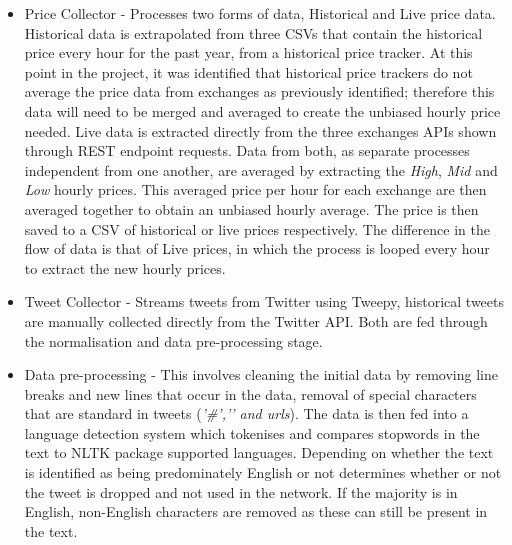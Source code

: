 \documentclass[oneside, 12pt]{article}
\begin{document}
		\begin{itemize}
			\item Price Collector - Processes two forms of data, Historical and Live price data. 
			\subitem Historical data is extrapolated from three CSVs that contain the historical price every hour for the past year, from a historical price tracker. At this point in the project, it was identified that historical price trackers do not average the price data from exchanges as previously identified; therefore this data will need to be merged and averaged to create the unbiased hourly price needed. 
			\subitem Live data is extracted directly from the three exchanges APIs shown through REST endpoint requests.
			\subitem Data from both, as separate processes independent from one another, are averaged by extracting the \textit{High}, \textit{Mid} and \textit{Low} hourly prices. This averaged price per hour for each exchange are then averaged together to obtain an unbiased hourly average. The price is then saved to a CSV of historical or live prices respectively. The difference in the flow of data is that of Live prices, in which the process is looped every hour to extract the new hourly prices. 
			\item Tweet Collector - Streams tweets from Twitter using Tweepy, historical tweets are manually collected directly from the Twitter API. Both are fed through the normalisation and data pre-processing stage.
			\item Data pre-processing - This involves cleaning the initial data by removing line breaks and new lines that occur in the data, removal of special characters that are standard in tweets (\textit{'\#','\@' and urls}). The data is then fed into a language detection system which tokenises and compares stopwords in the text to NLTK package supported languages. Depending on whether the text is identified as being predominately English or not determines whether or not the tweet is dropped and not used in the network. If the majority is in English, non-English characters are removed as these can still be present in the text.
		\end{itemize}
	
\end{document}
